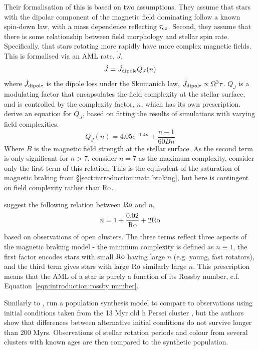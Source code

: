 Their formalisation of this is based on two assumptions. They assume that stars with the dipolar component of the magnetic field dominating  follow a known spin-down law, with a mass dependence reflecting $\tau_{\rm cz}$. Second, they assume that there is some relationship between field morphology and stellar spin rate. Specifically, that stars rotating more rapidly have more complex magnetic fields. This is formalised via an AML rate, $\dot J$,
\begin{equation}
    \dot J = \dot J_{\rm dipole}Q_J(n)
\end{equation}
where $\dot J_{\rm dipole}$ is the dipole loss under the Skumanich law, $\dot J_{\rm dipole} \propto \Omega^3 \tau$. $Q_J$ is a modulating factor that encapsulates the field complexity at the stellar surface, and is controlled by the complexity factor, $n$, which has its own prescription. \citet{garraffo2016} derive an equation for $Q_J$, based on fitting the results of simulations with varying field complexities.
\begin{equation}
    \label{eqn:introduction:garraffo complexity modulation}
    Q_J(n) = 4.05 e^{-1.4n} + \frac{n-1}{60Bn}
\end{equation}
Where $B$ is the magnetic field strength at the stellar surface. As the second term is only significant for $n > 7$, \citet{garraffo2018a} consider $n = 7$ as the maximum complexity, consider only the first term of this relation. This is the equivalent of the saturation of magnetic braking from \S\ref{sect:introduction:matt braking}, but here is contingent on field complexity rather than $\rm Ro$. 

\citet{garraffo2018a} suggest the following relation between $\rm Ro$ and $n$,
\begin{equation}
    \label{eqn:introduction:garraffo field complexity}
    n = 1 + \frac{0.02}{\rm Ro} + 2 {\rm Ro}
\end{equation}
based on observations of open clusters. The three terms reflect three aspects of the magnetic braking model - the minimum complexity is defined as $n \equiv 1$, the first factor encodes stars with small $\rm Ro$ having large $n$ (e.g. young, fast rotators), and the third term gives stars with large $\rm Ro$ similarly large $n$. 
This prescription means that the AML of a star is purely a function of its Rossby number, c.f. Equation~\ref{eqn:introduction:rossby number}.

Similarly to \citet{matt2015}, \citet{garraffo2018a} run a population synthesis model to compare to observations using initial conditions taken from the 13 Myr old h Persei cluster \citep{moraux2013}, but the authors show that differences between alternative initial conditions do not survive longer than 200 Myrs. Observations of stellar rotation periods and colour from several clusters with known ages are then compared to the synthetic population.

